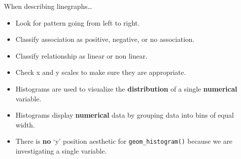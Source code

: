 \documentclass[
  letterpaper,
  DIV=11,
  numbers=noendperiod]{scrreprt}
\providecommand{\tightlist}{%
  \setlength{\itemsep}{0pt}\setlength{\parskip}{0pt}}\usepackage{longtable,booktabs,array}
\begin{document}
\begin{tcolorbox}[enhanced jigsaw, colframe=quarto-callout-note-color-frame, breakable, colback=white, toprule=.15mm, leftrule=.75mm, left=2mm, opacityback=0, rightrule=.15mm, arc=.35mm, bottomrule=.15mm]

When describing linegraphs\ldots{}

\begin{itemize}
\tightlist
\item
  Look for pattern going from left to right.
\item
  Classify association as positive, negative, or no association.
\item
  Classify relationship as linear or non linear.
\item
  Check x and y scales to make sure they are appropriate.
\end{itemize}

\end{tcolorbox}

\begin{tcolorbox}[enhanced jigsaw, colframe=quarto-callout-note-color-frame, breakable, colback=white, toprule=.15mm, leftrule=.75mm, left=2mm, opacityback=0, rightrule=.15mm, arc=.35mm, bottomrule=.15mm]

\begin{itemize}
\item
  Histograms are used to visualize the \textbf{distribution} of a single
  \textbf{numerical} variable.
\item
  Histograms display \textbf{numerical} data by grouping data into bins
  of equal width.
\item
  There is \textbf{no} `y' position aesthetic for
  \texttt{geom\_histogram()} because we are investigating a single
  variable.
\end{itemize}

\end{tcolorbox}
\end{document}
